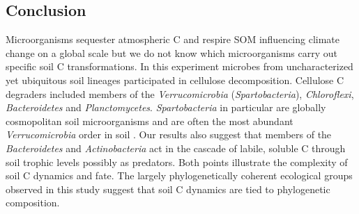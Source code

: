 \subsection{Conclusion} 
Microorganisms sequester atmospheric C and respire SOM influencing climate change on a global scale but we do not
know which microorganisms carry out specific soil C transformations. In
this experiment microbes from uncharacterized yet ubiquitous soil lineages
participated in cellulose decomposition. Cellulose C degraders included
members of the \textit{Verrucomicrobia} (\textit{Spartobacteria}),
\textit{Chloroflexi}, \textit{Bacteroidetes} and \textit{Planctomycetes}.
\textit{Spartobacteria} in particular are globally cosmopolitan soil
microorganisms and are often the most abundant \textit{Verrucomicrobia}
order in soil \citep{Bergmann_2011}. Our results also suggest that
members of the \textit{Bacteroidetes} and \textit{Actinobacteria} act in
the cascade of labile, soluble C through soil trophic levels possibly as
predators. Both points illustrate the complexity of soil C dynamics and
fate. The largely phylogenetically coherent ecological groups observed in
this study suggest that soil C dynamics are tied to phylogenetic
composition.
